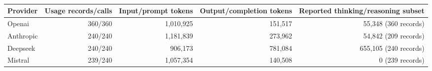 \begin{table}[!t]
\centering\ifshowrevisions\color{blue}\else\color{black}\fi\footnotesize
\caption{}
\label{tab:matched-usage}
\begin{tabular}{lrrrr}
\toprule Provider & Usage records/calls & Input/prompt tokens & Output/completion tokens & Reported thinking/reasoning subset \\
\midrule
Openai & 360/360 & 1,010,925 & 151,517 & 55,348 (360 records) \\
Anthropic & 240/240 & 1,181,839 & 273,962 & 54,842 (209 records) \\
Deepseek & 240/240 & 906,173 & 781,084 & 655,105 (240 records) \\
Mistral & 239/240 & 1,057,354 & 140,508 & 0 (239 records) \\
\bottomrule
\end{tabular}
\end{table}
